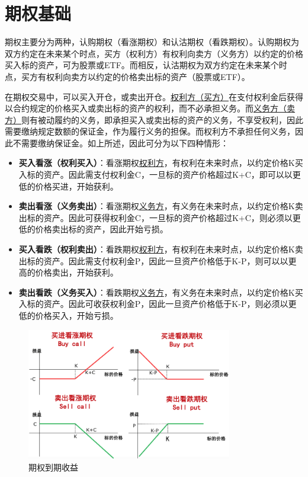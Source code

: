 \documentclass[11pt]{article}
\begin{document}
\maketitle
\tableofcontents

\section{期权基础}

期权主要分为两种，认购期权（看涨期权）和认沽期权（看跌期权）。认购期权为双方约定在未来某个时点，买方（权利方）有权利向卖方（义务方）以约定的价格买入标的资产，可为股票或ETF。而相反，认沽期权为双方约定在未来某个时点，买方有权利向卖方以约定的价格卖出标的资产（股票或ETF）。

在期权交易中，可以买入开仓，或卖出开仓。\uline{权利方（买方）}在支付权利金后获得以合约规定的价格买入或卖出标的资产的权利，而不必承担义务。而\uline{义务方（卖方）}则有被动履约的义务，即承担买入或卖出标的资产的义务，不享受权利，因此需要缴纳规定数额的保证金，作为履行义务的担保。而权利方不承担任何义务，因此不需要缴纳保证金。如上所述，因此可分为以下四种情形：
\begin{itemize}
    \item \textbf{买入看涨（权利买入）}：看涨期权\uline{权利方}，有权利在未来时点，以约定价格K买入标的资产。因此需支付权利金C，一旦标的资产价格超过K+C，即可以以更低的价格买进，开始获利。
    \item \textbf{卖出看涨（义务卖出）}：看涨期权\uline{义务方}，有义务在未来时点，以约定价格K卖出标的资产。因此可获得权利金C，一旦标的资产价格超过K+C，则必须以更低的价格卖出标的资产，因此开始亏损。
    \item \textbf{买入看跌（权利卖出）}：看跌期权\uline{权利方}，有权利在未来时点，以约定价格K卖出标的资产。因此需支付权利金P，因此一旦资产价格低于K-P，则可以以更高的价格卖出，开始获利。
    \item \textbf{卖出看跌（义务买入）}：看跌期权\uline{义务方}，有义务在未来时点，以约定价格K买入标的资产。因此可收获权利金P，因此一旦资产价格低于K-P，则必须以更低的价格买入，开始亏损。
\end{itemize}

\begin{figure}[H]
    \centering
    \includegraphics[width=0.8\textwidth]{fig/options-maturity-profit.png}
    \caption{期权到期收益}
    \label{fig:options-maturity-profit}
\end{figure}
\end{document}
